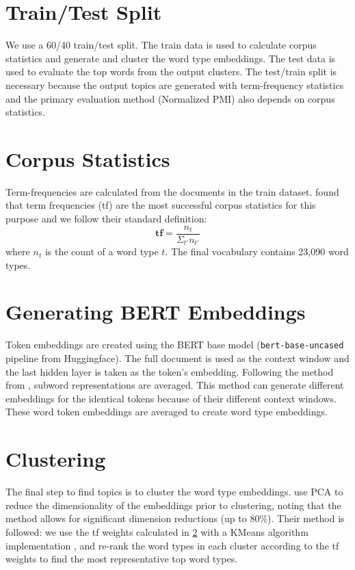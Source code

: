 \documentclass [11pt, proquest] {uwthesis}[2020/02/24]
\begin{document}
\section{Train/Test Split}\label{section:traintest}
We use a 60/40 train/test split. The train data is used to calculate corpus statistics and generate and cluster the word type embeddings. The test data is used to evaluate the top words from the output clusters. The test/train split is necessary because the output topics are generated with term-frequency statistics and the primary evaluation method (Normalized PMI) also depends on corpus statistics.

\section{Corpus Statistics}\label{section:corpusstats}
Term-frequencies are calculated from the documents in the train dataset. \cite{sia-etal-2020-tired} found that term frequencies (tf) are the most successful corpus statistics for this purpose and we follow their standard definition: $$ \textbf{tf} = \frac{n_t}{\Sigma_{t'}n_{t'}} $$  where $n_t$ is the count of a word type $t$. The final vocabulary contains 23,090 word types.

\section{Generating BERT Embeddings}\label{section:embeddings}
Token embeddings are created using the BERT base model \cite{DBLP:journals/corr/abs-1810-04805}  (\verb|bert-base-uncased| pipeline from Huggingface).
The full document is used as the context window and the last hidden layer is taken as the token’s embedding. Following the method from \cite{sia-etal-2020-tired}, subword representations are averaged. This method can generate different embeddings for the identical tokens because of their different context windows. These word token embeddings are averaged to create word type embeddings.

\section{Clustering}\label{section:clustering}

The final step to find topics is to cluster the word type embeddings.
\cite{sia-etal-2020-tired} use PCA to reduce the dimensionality of the embeddings prior to clustering, noting that the method allows for significant dimension reductions (up to 80\%). Their method is followed: we use the tf weights calculated in \ref{section:corpusstats} with a KMeans algorithm implementation \citep{scikit-learn}, and re-rank the word types in each cluster according to the tf weights to find the most representative top word types.
\end{document}
